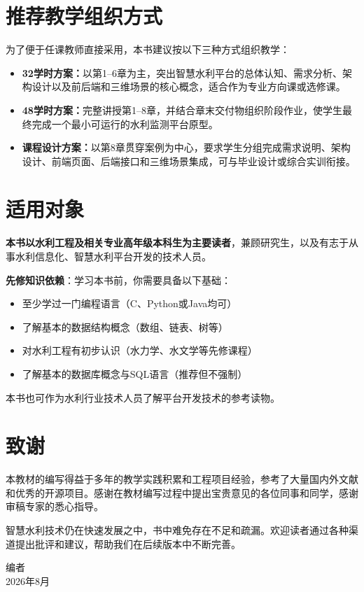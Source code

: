 \section*{推荐教学组织方式}

为了便于任课教师直接采用，本书建议按以下三种方式组织教学：

\begin{itemize}
\item \textbf{32学时方案：}以第1--6章为主，突出智慧水利平台的总体认知、需求分析、架构设计以及前后端和三维场景的核心概念，适合作为专业方向课或选修课。
\item \textbf{48学时方案：}完整讲授第1--8章，并结合章末交付物组织阶段作业，使学生最终完成一个最小可运行的水利监测平台原型。
\item \textbf{课程设计方案：}以第8章贯穿案例为中心，要求学生分组完成需求说明、架构设计、前端页面、后端接口和三维场景集成，可与毕业设计或综合实训衔接。
\end{itemize}

\section*{适用对象}

\textbf{本书以水利工程及相关专业高年级本科生为主要读者}，兼顾研究生，以及有志于从事水利信息化、智慧水利平台开发的技术人员。

\textbf{先修知识依赖}：学习本书前，你需要具备以下基础：

\begin{itemize}
\item 至少学过一门编程语言（C、Python或Java均可）
\item 了解基本的数据结构概念（数组、链表、树等）
\item 对水利工程有初步认识（水力学、水文学等先修课程）
\item 了解基本的数据库概念与SQL语言（推荐但不强制）
\end{itemize}

本书也可作为水利行业技术人员了解平台开发技术的参考读物。

\section*{致谢}

本教材的编写得益于多年的教学实践积累和工程项目经验，参考了大量国内外文献和优秀的开源项目。感谢在教材编写过程中提出宝贵意见的各位同事和同学，感谢审稿专家的悉心指导。

智慧水利技术仍在快速发展之中，书中难免存在不足和疏漏。欢迎读者通过各种渠道提出批评和建议，帮助我们在后续版本中不断完善。

\vspace{2em}
\begin{flushright}
编者\\
2026年8月
\end{flushright}
